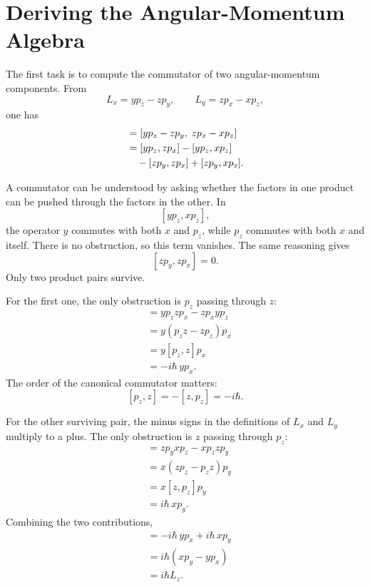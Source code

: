 \section{Deriving the Angular-Momentum Algebra}

The first task is to compute the commutator of two angular-momentum components. From
\[
L_x=yp_z-zp_y,\qquad
L_y=zp_x-xp_z,
\]
one has
\begin{align}
[L_x,L_y]
&=[yp_z-zp_y,\;zp_x-xp_z] \\
&=[yp_z,zp_x]-[yp_z,xp_z] \notag\\
&\quad{}-[zp_y,zp_x]+[zp_y,xp_z].
\end{align}

\begin{classroomqa}
\end{classroomqa}

A commutator can be understood by asking whether the factors in one product can be pushed through the factors in the other. In
\[
[yp_z,xp_z],
\]
the operator \(y\) commutes with both \(x\) and \(p_z\), while \(p_z\) commutes with both \(x\) and itself. There is no obstruction, so this term vanishes. The same reasoning gives
\[
[zp_y,zp_x]=0.
\]
Only two product pairs survive.

For the first one, the only obstruction is \(p_z\) passing through \(z\):
\begin{align}
[yp_z,zp_x]
&=yp_zzp_x-zp_xyp_z \\
&=y(p_zz-zp_z)p_x \\
&=y[p_z,z]p_x \\
&=-i\hbar\,yp_x.
\end{align}
The order of the canonical commutator matters:
\[
[p_z,z]=-[z,p_z]=-i\hbar.
\]

For the other surviving pair, the minus signs in the definitions of \(L_x\) and \(L_y\) multiply to a plus. The only obstruction is \(z\) passing through \(p_z\):
\begin{align}
[zp_y,xp_z]
&=zp_yxp_z-xp_zzp_y \\
&=x(zp_z-p_zz)p_y \\
&=x[z,p_z]p_y \\
&=i\hbar\,xp_y.
\end{align}
Combining the two contributions,
\begin{align}
[L_x,L_y]
&=-i\hbar\,yp_x+i\hbar\,xp_y \\
&=i\hbar(xp_y-yp_x) \\
&=i\hbar L_z.
\end{align}

